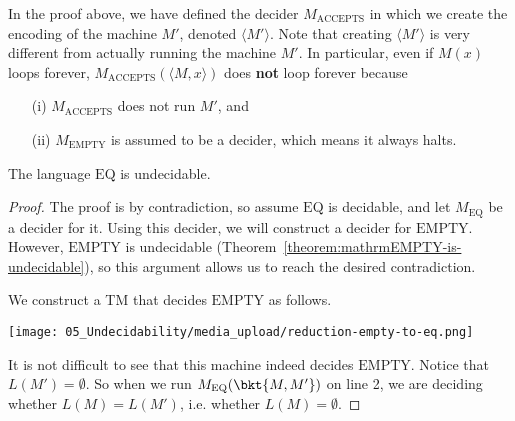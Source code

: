 \begin{note}
\label{note:Creating-an-encoding-of-a-machine-vs-running-it}
In the proof above, we have defined the decider $M_\text{ACCEPTS}$ in which we create the encoding of the machine $M'$, denoted $\langle M' \rangle$. Note that creating $\langle M' \rangle$ is very different from actually running the machine $M'$. In particular, even if $M(x)$ loops forever, $M_\text{ACCEPTS}(\langle M,x \rangle)$ does \textbf{not} loop forever because 
\begin{enumerate}
    \item[(i)] $M_\text{ACCEPTS}$ does not run $M'$, and
    \item[(ii)] $M_\text{EMPTY}$ is assumed to be a decider, which means it always halts.
\end{enumerate}

\end{note}

\begin{flex}
\label{grp:theorem:mathrmEQ-is-undecidable}

\begin{theorem}
\label{theorem:mathrmEQ-is-undecidable}
The language $\mathrm{EQ}$ is undecidable.

\end{theorem}

\begin{proof}
\label{prf:Undecidable-Languages::contradiction}
The proof is by contradiction, so assume $\text{EQ}$ is decidable, and let $M_\text{EQ}$ be a decider for it. Using this decider, we will construct a decider for $\text{EMPTY}$. However, $\text{EMPTY}$ is undecidable (Theorem~\ref{theorem:mathrmEMPTY-is-undecidable}), so this argument allows us to reach the desired contradiction.

We construct a TM that decides $\text{EMPTY}$ as follows.

\begin{center}
\texttt{[image: 05\_Undecidability/media\_upload/reduction-empty-to-eq.png]}
\end{center}

It is not difficult to see that this machine indeed decides $\text{EMPTY}$. Notice that $L(M') = \emptyset$. So when we run $M_\text{EQ}(\bkt{M,M'})$ on line 2, we are deciding whether $L(M) = L(M')$, i.e. whether $L(M) = \emptyset$.

\end{proof}
\end{flex}

